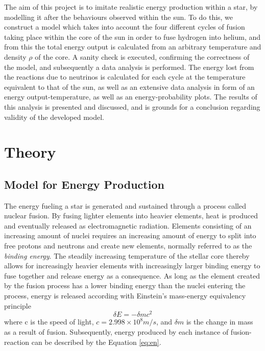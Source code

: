 \documentclass[10pt, nofootinbib, twocolumn]{revtex4-1}
\begin{document}
The aim of this project is to imitate realistic energy production within a star, by modelling it after the behaviours observed within the sun. To do this, we construct a model which takes into account the four different cycles of fusion taking place within the core of the sun in order to fuse hydrogen into helium, and from this the total energy output is calculated from an arbitrary temperature and density $\rho$ of the core. A sanity check is executed, confirming the correctness of the model, and subsequently a data analysis is performed. The energy lost from the reactions due to neutrinos is calculated for each cycle at the temperature equivalent to that of the sun, as well as an extensive data analysis in form of an energy output-temperature, as well as an energy-probability plots. The results of this analysis is presented and discussed, and is grounds for a conclusion regarding validity of the developed model.


\section{Theory}\label{sec:theory}
\subsection{Model for Energy Production}
The energy fueling a star is generated and sustained through a process called nuclear fusion. By fusing lighter elements into heavier elements, heat is produced and eventually released as electromagnetic radiation. Elements consisting of an increasing amount of nuclei requires an increasing amount of energy to split into free protons and neutrons and create new elements, normally referred to as the \textit{binding energy}. The steadily increasing temperature of the stellar core thereby allows for increasingly heavier elements with increasingly larger binding energy to fuse together and release energy as a consequence. As long as the element created by the fusion process has a lower binding energy than the nuclei entering the process, energy is released according with Einstein's mass-energy equivalency principle \cite{ast}
\begin{equation}
    \delta E = -\delta m c^2 \label{eq:en}
\end{equation}
where c is the speed of light, $c=2.998\times10^8m/s$, and $\delta m$ is the change in mass as a result of fusion. Subsequently, energy produced by each instance of fusion-reaction can be described by the Equation \eqref{eq:en}. \\
\end{document}
